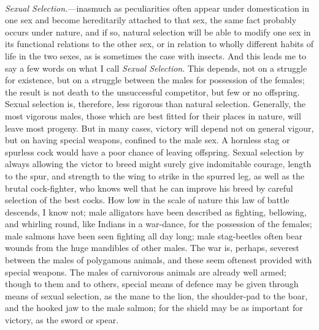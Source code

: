 \documentclass{article}
\begin{document}
\\
\textit{Sexual Selection.}—inasmuch as peculiarities often appear under domestication in one sex and become hereditarily attached to that sex, the same fact probably occurs under nature, and if so, natural selection will be able to modify one sex in its functional relations to the other sex, or in relation to wholly different habits of life in the two sexes, as is sometimes the case with insects. And this leads me to say a few words on what I call \textit{Sexual Selection}. This depends, not on a struggle for existence, but on a struggle between the males for possession of the females; the result is not death to the unsuccessful competitor, but few or no offspring. Sexual selection is, therefore, less rigorous than natural selection. Generally, the most vigorous males, those which are best fitted for their places in nature, will leave most progeny. But in many cases, victory will depend not on general vigour, but on having special weapons, confined to the male sex. A hornless stag or spurless cock would have a poor chance of leaving offspring. Sexual selection by always allowing the victor to breed might surely give indomitable courage, length to the spur, and strength to the wing to strike in the spurred leg, as well as the brutal cock-fighter, who knows well that he can improve his breed by careful selection of the best cocks. How low in the scale of nature this law of battle descends, I know not; male alligators have been described as fighting, bellowing, and whirling round, like Indians in a war-dance, for the possession of the females; male salmons have been seen fighting all day long; male stag-beetles often bear wounds from the huge mandibles of other males. The war is, perhaps, severest between the males of polygamous animals, and these seem oftenest provided with special weapons. The males of carnivorous animals are already well armed; though to them and to others, special means of defence may be given through means of sexual selection, as the mane to the lion, the shoulder-pad to the boar, and the hooked jaw to the male salmon; for the shield may be as important for victory, as the sword or spear.\\
\end{document}

